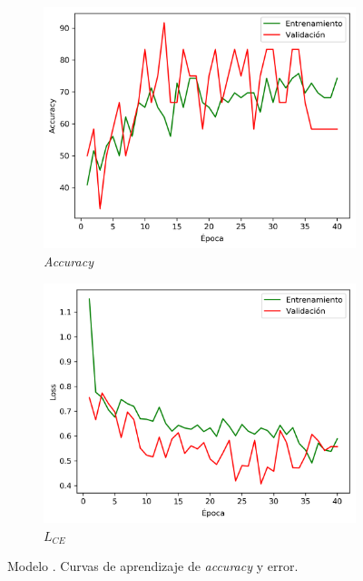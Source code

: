 \begin{figure}[h]
    \begin{subfigure}{0.5\linewidth}
        \centering
        \includegraphics[width=\linewidth]{imagenes/experiments/GS-25_Accuracy.png}
        \caption{\textit{Accuracy}}
        \label{subfig:acc_Nodule-98-30K-GS-25}
    \end{subfigure}
    \begin{subfigure}{0.5\linewidth}
        \centering
        \includegraphics[width=\linewidth]{imagenes/experiments/GS-25_Loss.png}
        \caption{$L_{CE}$}
        \label{subfig:loss_Nodule-98-30K-GS-25}
    \end{subfigure}
    \caption[Nodule-98-30K-GS-25: Curvas de aprendizaje]{Modelo . Curvas de aprendizaje de \textit{accuracy} y error.}
    \label{fig:Nodule-98-30K-GS-25}
\end{figure}

